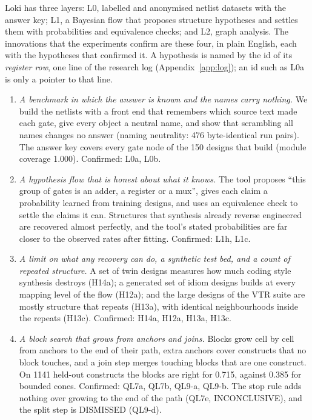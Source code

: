 \documentclass[conference]{IEEEtran}
\begin{document}
Loki has three layers: L0, labelled and anonymised netlist datasets with the answer key; L1, %
a Bayesian flow that proposes structure hypotheses and settles them with probabilities and
equivalence checks; and L2, graph analysis. The innovations that the experiments confirm are
these four, in plain English, each with the hypotheses that confirmed it. A hypothesis is named by the id of its \emph{register row}, one line of the research log (Appendix~\ref{app:log}); an id such as L0a is only a pointer to that line.
\begin{enumerate}
\item \emph{A benchmark in which the answer is known and the names carry nothing.} We build
the netlists with a front end that remembers which source text made each gate, give every
object a neutral name, and show that scrambling all names changes no answer
(naming neutrality: 476 byte-identical run pairs). The answer key covers every gate node of the
150 designs that build (module coverage 1.000). Confirmed: L0a, L0b.
\item \emph{A hypothesis flow that is honest about what it knows.} The tool proposes
``this group of gates is an adder, a register or a mux'', gives each claim a probability
learned from training designs, and uses an equivalence check to settle the claims it can.
Structures that synthesis already reverse engineered are recovered almost perfectly, and the
tool's stated probabilities are far closer to the observed rates after fitting. Confirmed: L1h, L1c.
\item \emph{A limit on what any recovery can do, a synthetic test bed, and a count of repeated
structure.} A set of twin designs measures how much coding style synthesis destroys (H14a); a
generated set of idiom designs builds at every mapping level of the flow (H12a); and the large
designs of the VTR suite are mostly structure that repeats (H13a), with identical neighbourhoods
inside the repeats (H13c). Confirmed: H14a, H12a, H13a, H13c.
\item \emph{A block search that grows from anchors and joins.} Blocks grow cell by cell from
anchors to the end of their path, extra anchors cover constructs that no block touches, and a join
step merges touching blocks that are one construct. On 1141 held-out constructs the blocks are
right for 0.715, against 0.385 for bounded cones. Confirmed: QL7a, QL7b, QL9-a, QL9-b. The
stop rule adds nothing over growing to the end of the path (QL7e, INCONCLUSIVE), and the split step
is DISMISSED (QL9-d).
\end{enumerate}
\end{document}
